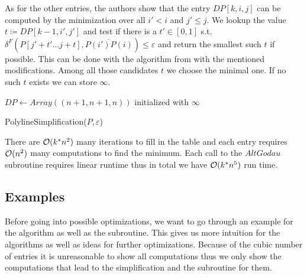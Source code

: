 As for the other entries, the authors show that the entry \(DP[k, i, j]\) can be computed by the minimization over all \(i' < i\) and \(j' \leq j\). We lookup the value \(t \coloneq DP[k-1, i', j']\) and test if there is a \(t' \in [0, 1]\) s.t. \(\delta^F(P[j' + t' \dots j + t], \overline{P(i')P(i)}) \leq \varepsilon\) and return the smallest such \(t\) if possible. This can be done with the algorithm from \citeauthor{computing_the_frechet_distance_between_two_polygonal_curves} with the mentioned modifications. Among all those candidates \(t\) we choose the minimal one. If no such \(t\) exists we can store \(\infty\).

\begin{algorithm}[ht]
  \DontPrintSemicolon
  \BlankLine
  \(DP \gets Array((n + 1, n + 1, n))\) initialized with \(\infty\) \;
  \caption{PolylineSimplification(\(P, \varepsilon\))}
  \label{algo:simplify_simple}
\end{algorithm}

There are \(\mathcal{O}(k^* n^2)\) many iterations to fill in the table and each entry requires \(\mathcal{O}(n^2)\) many computations to find the minimum. Each call to the \(AltGodau\) subroutine requires linear runtime thus in total we have \(\mathcal{O}(k^*n^5)\) run time.

\subsection{Examples}
Before going into possible optimizations, we want to go through an example for the algorithm as well as the \citeauthor{computing_the_frechet_distance_between_two_polygonal_curves} subroutine. This gives us more intuition for the algorithms as well as ideas for further optimizations. Because of the cubic number of entries it is unreasonable to show all computations thus we only show the computations that lead to the simplification and the subroutine for them. 

